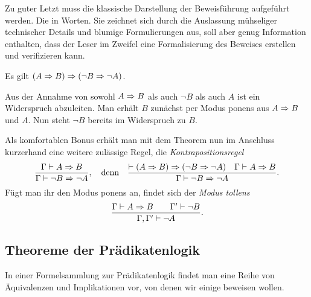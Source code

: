 Zu guter Letzt muss die klassische Darstellung der Beweisführung
aufgeführt werden. Die in Worten. Sie zeichnet sich durch die Auslassung
mühseliger technischer Details und blumige Formulierungen aus,
soll aber genug Information enthalten, dass der Leser im Zweifel
eine Formalisierung des Beweises erstellen und verifizieren kann.

\begin{Satz}
Es gilt $(A\Rightarrow B)\Rightarrow (\lnot B\Rightarrow\lnot A)$.
\end{Satz}
 Aus der Annahme von sowohl $A\Rightarrow B$ als
auch $\lnot B$ als auch $A$ ist ein Widerspruch abzuleiten.
Man erhält $B$ zunächst per Modus ponens aus $A\Rightarrow B$ und $A$.
Nun steht $\lnot B$ bereits im Widerspruch zu $B$.\,\qedsymbol

Als komfortablen Bonus erhält man mit dem Theorem nun im Anschluss
kurzerhand eine weitere zulässige Regel, die
\emph{Kontrapositionsregel}
\[\dfrac{\Gamma\vdash A\Rightarrow B}{\Gamma\vdash\lnot B\Rightarrow\lnot A},
\quad\text{denn}\quad
\dfrac{\vdash (A\Rightarrow B)\Rightarrow (\lnot B\Rightarrow\lnot A)\quad\Gamma\vdash A\Rightarrow B}
{\Gamma\vdash \lnot B\Rightarrow\lnot A}.\]
Fügt man ihr den Modus ponens an, findet sich der
\emph{Modus tollens}
\[\dfrac{\Gamma\vdash A\Rightarrow B\qquad\Gamma'\vdash\lnot B}
{\Gamma,\Gamma'\vdash\lnot A}.\]


\subsection{Theoreme der Prädikatenlogik}

In einer Formelsammlung zur Prädikatenlogik findet man eine Reihe von
Äquivalenzen und Implikationen vor, von denen wir einige beweisen
wollen.

